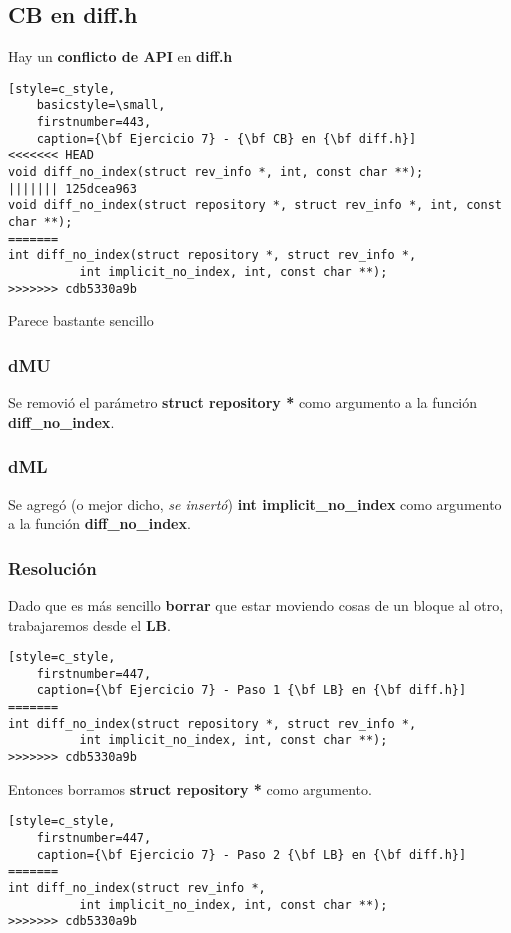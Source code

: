 \subsection*{CB en diff.h}

Hay un {\bf conflicto de API} en {\bf diff.h}

\begin{lstlisting}[style=c_style,
	basicstyle=\small,
	firstnumber=443,
	caption={\bf Ejercicio 7} - {\bf CB} en {\bf diff.h}]
<<<<<<< HEAD
void diff_no_index(struct rev_info *, int, const char **);
||||||| 125dcea963
void diff_no_index(struct repository *, struct rev_info *, int, const char **);
=======
int diff_no_index(struct repository *, struct rev_info *,
		  int implicit_no_index, int, const char **);
>>>>>>> cdb5330a9b
\end{lstlisting}

Parece bastante sencillo

\subsubsection*{dMU}
Se removió el parámetro {\bf struct repository *} como argumento a la función {\bf diff\_no\_index}.

\subsubsection*{dML}
Se agregó (o mejor dicho, {\it se insertó}) {\bf int implicit\_no\_index} como argumento a la función {\bf diff\_no\_index}.

\subsubsection*{Resolución}
Dado que es más sencillo {\bf borrar} que estar moviendo cosas de un bloque al otro, trabajaremos desde el {\bf LB}.

\begin{lstlisting}[style=c_style,
	firstnumber=447,
	caption={\bf Ejercicio 7} - Paso 1 {\bf LB} en {\bf diff.h}]
=======
int diff_no_index(struct repository *, struct rev_info *,
		  int implicit_no_index, int, const char **);
>>>>>>> cdb5330a9b
\end{lstlisting}

Entonces borramos {\bf struct repository *} como argumento.

\begin{lstlisting}[style=c_style,
	firstnumber=447,
	caption={\bf Ejercicio 7} - Paso 2 {\bf LB} en {\bf diff.h}]
=======
int diff_no_index(struct rev_info *,
		  int implicit_no_index, int, const char **);
>>>>>>> cdb5330a9b
\end{lstlisting}


